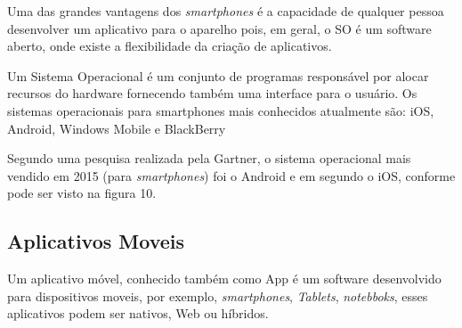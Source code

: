 Uma das grandes vantagens dos \textit{smartphones} é a capacidade de qualquer pessoa desenvolver um aplicativo para o aparelho pois, em geral, o SO é um software aberto, onde existe a flexibilidade da criação de aplicativos.

Um Sistema Operacional é um conjunto de programas responsável por alocar recursos do hardware fornecendo também uma interface para o usuário. Os sistemas operacionais para smartphones mais conhecidos atualmente são: iOS, Android, Windows Mobile e BlackBerry \cite{oqsmar}

Segundo uma pesquisa realizada pela Gartner, o sistema operacional mais vendido em 2015 (para \textit{smartphones}) foi o Android e em segundo o iOS, conforme pode ser visto na figura 10. \cite{gar}
\begin{figure}[h!]
		\centering
	\end{figure}

\subsection{Aplicativos Moveis}
Um aplicativo móvel, conhecido também como App é um software desenvolvido para dispositivos moveis, por exemplo, \textit{smartphones},  \textit{Tablets}, \textit{notebboks}, esses aplicativos podem ser nativos, Web ou híbridos. \cite{dif}

